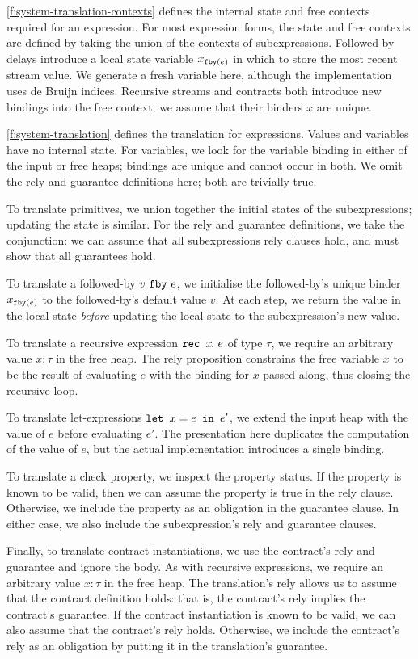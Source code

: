 \documentclass[a4paper,UKenglish,cleveref, autoref, thm-restate,anonymous]{lipics-v2021}
\begin{document}
\autoref{f:system-translation-contexts} defines the internal state and free contexts required for an expression.
For most expression forms, the state and free contexts are defined by taking the union of the contexts of subexpressions.
Followed-by delays introduce a local state variable $x_{\tt{fby}(e)}$ in which to store the most recent stream value.
We generate a fresh variable here, although the implementation uses de Bruijn indices.
Recursive streams and contracts both introduce new bindings into the free context; we assume that their binders $x$ are unique.

\autoref{f:system-translation} defines the translation for expressions.
Values and variables have no internal state.
For variables, we look for the variable binding in either of the input or free heaps; bindings are unique and cannot occur in both.
We omit the rely and guarantee definitions here; both are trivially true.

To translate primitives, we union together the initial states of the subexpressions; updating the state is similar.
For the rely and guarantee definitions, we take the conjunction: we can assume that all subexpressions rely clauses hold, and must show that all guarantees hold.

To translate a followed-by $\xfby{v}{e}$, we initialise the followed-by's unique binder $x_{\tt{fby}(e)}$ to the followed-by's default value $v$.
At each step, we return the value in the local state \emph{before} updating the local state to the subexpression's new value.

To translate a recursive expression $\xrec{x}{e}$ of type $\tau$, we require an arbitrary value $x: \tau$ in the free heap.
The rely proposition constrains the free variable $x$ to be the result of evaluating $e$ with the binding for $x$ passed along, thus closing the recursive loop.

To translate let-expressions $\xlet{x}{e}{e'}$, we extend the input heap with the value of $e$ before evaluating $e'$.
The presentation here duplicates the computation of the value of $e$, but the actual implementation introduces a single binding.

To translate a check property, we inspect the property status.
If the property is known to be valid, then we can assume the property is true in the rely clause.
Otherwise, we include the property as an obligation in the guarantee clause.
In either case, we also include the subexpression's rely and guarantee clauses.

Finally, to translate contract instantiations, we use the contract's rely and guarantee and ignore the body.
As with recursive expressions, we require an arbitrary value $x: \tau$ in the free heap.
The translation's rely allows us to assume that the contract definition holds: that is, the contract's rely implies the contract's guarantee.
If the contract instantiation is known to be valid, we can also assume that the contract's rely holds.
Otherwise, we include the contract's rely as an obligation by putting it in the translation's guarantee.
\end{document}
